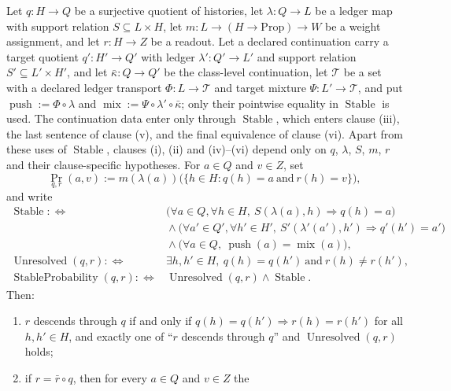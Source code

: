 \begin{theorem}\label{thm:F23}
Let \(q:H\to Q\) be a surjective quotient of histories, let
\(\lambda:Q\to L\) be a ledger map with support relation
\(S\subseteq L\times H\), let
\(m:L\to (H\to\mathrm{Prop})\to W\) be a weight assignment, and let
\(r:H\to Z\) be a readout.  Let a declared continuation carry a target
quotient \(q':H'\to Q'\) with ledger \(\lambda':Q'\to L'\) and support
relation \(S'\subseteq L'\times H'\), and let
\(\bar\kappa:Q\to Q'\) be the class-level continuation, let \(\mathcal T\) be a
set with a declared ledger transport \(\Phi:L\to\mathcal T\) and target
mixture \(\Psi:L'\to\mathcal T\), and put
\(\operatorname{push}:=\Phi\circ\lambda\) and
\(\operatorname{mix}:=\Psi\circ\lambda'\circ\bar\kappa\); only their pointwise
equality in \(\operatorname{Stable}\) is used. The continuation data enter only
through \(\operatorname{Stable}\), which enters clause (iii), the last sentence
of clause (v), and the final equivalence of clause (vi). Apart from these uses
of \(\operatorname{Stable}\), clauses (i), (ii) and (iv)--(vi) depend only on
\(q\), \(\lambda\), \(S\), \(m\), \(r\) and their clause-specific hypotheses.  For \(a\in Q\) and \(v\in Z\), set
\[
  \operatorname{Pr}_{q,r}(a,v)
  :=
  m(\lambda(a))\bigl(\{h\in H:q(h)=a\ \text{and}\ r(h)=v\}\bigr),
\]
and write
\begin{align*}
  \operatorname{Stable}
  :\iff{}&
  \bigl(\forall a\in Q,\forall h\in H,\
    S(\lambda(a),h)\Rightarrow q(h)=a\bigr)\\
  &{}\wedge
  \bigl(\forall a'\in Q',\forall h'\in H',\
    S'(\lambda'(a'),h')\Rightarrow q'(h')=a'\bigr)\\
  &{}\wedge
  \bigl(\forall a\in Q,\
    \operatorname{push}(a)=\operatorname{mix}(a)\bigr),\\
  \operatorname{Unresolved}(q,r)
  :\iff{}&
  \exists h,h'\in H,\ q(h)=q(h')\ \text{and}\ r(h)\ne r(h'),\\
  \operatorname{StableProbability}(q,r)
  :\iff{}&
  \operatorname{Unresolved}(q,r)
  \wedge
  \operatorname{Stable}.
\end{align*}
Then:
\begin{enumerate}[label=(\roman*)]
\item \(r\) descends through \(q\) if and only if
  \(q(h)=q(h')\Rightarrow r(h)=r(h')\) for all \(h,h'\in H\), and exactly
  one of ``\(r\) descends through \(q\)'' and \(\operatorname{Unresolved}(q,r)\)
  holds;
\item if \(r=\bar r\circ q\), then for every \(a\in Q\) and \(v\in Z\) the

\end{enumerate}
\end{theorem}
